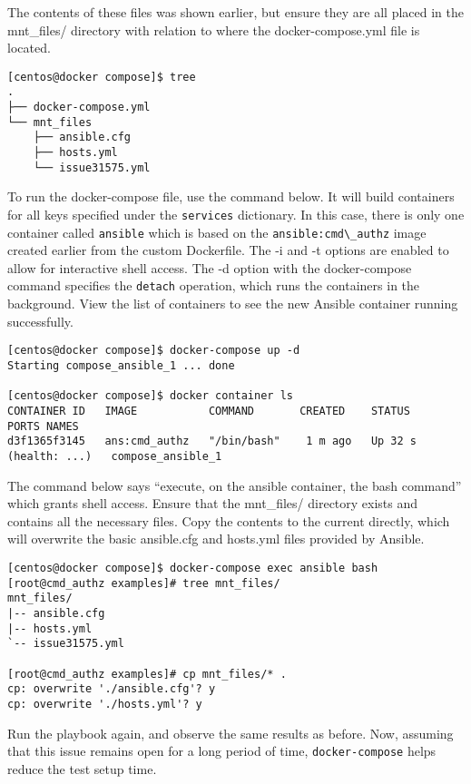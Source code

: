 The contents of these files was shown earlier, but ensure they are all placed
in the mnt\_files/ directory with relation to where the docker-compose.yml file
is located.

\begin{verbatim}
[centos@docker compose]$ tree
.
├── docker-compose.yml
└── mnt_files
    ├── ansible.cfg
    ├── hosts.yml
    └── issue31575.yml
\end{verbatim}

To run the docker-compose file, use the command below. It will build
containers for all keys specified under the \verb|services| dictionary. In this
case, there is only one container called \verb|ansible| which is based on the
\verb|ansible:cmd\_authz| image created earlier from the custom Dockerfile. The -i
and -t options are enabled to allow for interactive shell access. The -d
option with the docker-compose command specifies the \verb|detach| operation, which
runs the containers in the background. View the list of containers to see the
new Ansible container running successfully.

\begin{verbatim}
[centos@docker compose]$ docker-compose up -d
Starting compose_ansible_1 ... done

[centos@docker compose]$ docker container ls
CONTAINER ID   IMAGE           COMMAND       CREATED    STATUS            PORTS NAMES
d3f1365f3145   ans:cmd_authz   "/bin/bash"    1 m ago   Up 32 s (health: ...)   compose_ansible_1
\end{verbatim}

The command below says ``execute, on the ansible container, the bash command''
which grants shell access. Ensure that the mnt\_files/ directory exists and
contains all the necessary files. Copy the contents to the current directly,
which will overwrite the basic ansible.cfg and hosts.yml files provided by
Ansible.

\begin{verbatim}
[centos@docker compose]$ docker-compose exec ansible bash
[root@cmd_authz examples]# tree mnt_files/
mnt_files/
|-- ansible.cfg
|-- hosts.yml
`-- issue31575.yml

[root@cmd_authz examples]# cp mnt_files/* .
cp: overwrite './ansible.cfg'? y
cp: overwrite './hosts.yml'? y
\end{verbatim}

Run the playbook again, and observe the same results as before. Now, assuming
that this issue remains open for a long period of time, \verb|docker-compose|
helps reduce the test setup time.


